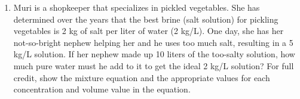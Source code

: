 \documentclass[letterpaper,12pt,fleqn]{article}
\begin{document}
\begin{enumerate}
\newpage

\item Muri is a shopkeeper that specializes in pickled vegetables. She has
determined over the years that the best brine (salt solution) for pickling
vegetables is 2 kg of salt per liter of water (2 kg/L).  One day, she has her
not-so-bright nephew helping her and he uses too much salt, resulting in
a 5 kg/L solution.  If her nephew made up 10 liters of the too-salty solution,
how much pure water must he add to it to get the ideal 2 kg/L solution? For
full credit, show the mixture equation and the appropriate values for each
concentration and volume value in the equation.
\end{enumerate}
\end{document}
